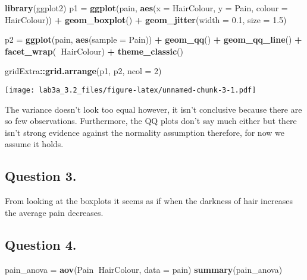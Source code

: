 \documentclass[
]{article}
\newenvironment{Shaded}{\begin{snugshade}}{\end{snugshade}}
\newcommand{\DataTypeTok}[1]{\textcolor[rgb]{0.13,0.29,0.53}{#1}}
\newcommand{\DecValTok}[1]{\textcolor[rgb]{0.00,0.00,0.81}{#1}}
\newcommand{\FloatTok}[1]{\textcolor[rgb]{0.00,0.00,0.81}{#1}}
\newcommand{\KeywordTok}[1]{\textcolor[rgb]{0.13,0.29,0.53}{\textbf{#1}}}
\newcommand{\NormalTok}[1]{#1}
\newcommand{\OperatorTok}[1]{\textcolor[rgb]{0.81,0.36,0.00}{\textbf{#1}}}
\newcommand{\StringTok}[1]{\textcolor[rgb]{0.31,0.60,0.02}{#1}}
\begin{document}
\begin{Shaded}
\begin{Highlighting}[]
\KeywordTok{library}\NormalTok{(ggplot2)}
\NormalTok{p1 =}\StringTok{ }\KeywordTok{ggplot}\NormalTok{(pain, }\KeywordTok{aes}\NormalTok{(}\DataTypeTok{x =}\NormalTok{ HairColour, }\DataTypeTok{y =}\NormalTok{ Pain, }\DataTypeTok{colour =}\NormalTok{ HairColour)) }\OperatorTok{+}\StringTok{ }
\StringTok{  }\KeywordTok{geom_boxplot}\NormalTok{() }\OperatorTok{+}\StringTok{ }
\StringTok{  }\KeywordTok{geom_jitter}\NormalTok{(}\DataTypeTok{width =} \FloatTok{0.1}\NormalTok{, }\DataTypeTok{size =} \FloatTok{1.5}\NormalTok{)}

\NormalTok{p2 =}\StringTok{ }\KeywordTok{ggplot}\NormalTok{(pain, }\KeywordTok{aes}\NormalTok{(}\DataTypeTok{sample =}\NormalTok{ Pain)) }\OperatorTok{+}\StringTok{ }
\StringTok{  }\KeywordTok{geom_qq}\NormalTok{() }\OperatorTok{+}\StringTok{ }\KeywordTok{geom_qq_line}\NormalTok{() }\OperatorTok{+}\StringTok{ }\KeywordTok{facet_wrap}\NormalTok{(}\OperatorTok{~}\NormalTok{HairColour) }\OperatorTok{+}\StringTok{ }\KeywordTok{theme_classic}\NormalTok{()}

\NormalTok{gridExtra}\OperatorTok{::}\KeywordTok{grid.arrange}\NormalTok{(p1, p2, }\DataTypeTok{ncol =} \DecValTok{2}\NormalTok{)}
\end{Highlighting}
\end{Shaded}

\texttt{[image: lab3a\_3.2\_files/figure-latex/unnamed-chunk-3-1.pdf]}

The variance doesn't look too equal however, it isn't conclusive because
there are so few observations. Furthermore, the QQ plots don't say much
either but there isn't strong evidence against the normality assumption
therefore, for now we assume it holds.

\hypertarget{question-3.}{%
\subsection{Question 3.}\label{question-3.}}

From looking at the boxplots it seems as if when the darkness of hair
increases the average pain decreases.

\hypertarget{question-4.}{%
\subsection{Question 4.}\label{question-4.}}

\begin{Shaded}
\begin{Highlighting}[]
\NormalTok{pain_anova =}\StringTok{ }\KeywordTok{aov}\NormalTok{(Pain}\OperatorTok{~}\NormalTok{HairColour, }\DataTypeTok{data =}\NormalTok{ pain)}
\KeywordTok{summary}\NormalTok{(pain_anova)}
\end{Highlighting}
\end{Shaded}
\end{document}
